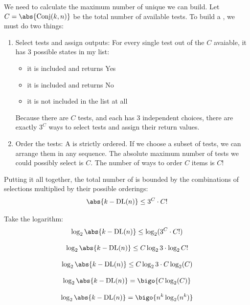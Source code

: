 We need to calculate the maximum number of unique  we can build. Let $C=\abs{\text{Conj}(k,n)}$ be the total number of available tests. To build  a , we must do two things:
\begin{enumerate}
    \item Select tests and assign outputs: For every single test out of the $C$ avaiable, it has $3$ possible states in my list:
    \begin{itemize}
        \item it is included and returns Yes
        \item it is included and returns No
        \item it is not included in the list at all
    \end{itemize}
    Because there are $C$ tests, and each has $3$ independent choices, there are exactly $3^C$ ways to select tests and assign their return values.
    \item Order the tests: A  is strictly ordered. If we choose a subset of tests, we can arrange them in any sequence. The absolute maximum number of tests we could possibly select is $C$. The number of ways to order $C$ items is $C!$
\end{enumerate}

Putting it all together, the total number of  is bounded by the combinations of selections multiplied by their possible orderings:
\[
\abs{k-\text{DL}(n)} \leq 3^C \cdot C!
\]

Take the logarithm:
\[
\log_2 \abs{k-\text{DL}(n)} \leq \log_2 (3^C \cdot C!)
\]

\[
\log_2 \abs{k-\text{DL}(n)} \leq C\log_2 3 \cdot \log_2 C!
\]


\[
\log_2 \abs{k-\text{DL}(n)} \leq C\log_2 3 \cdot C \log_2(C)
\]



\[
\log_2 \abs{k-\text{DL}(n)} = \bigo{C \log_2(C)}
\]


\[
\log_2 \abs{k-\text{DL}(n)} = \bigo{n^k \log_2(n^k)}
\]

